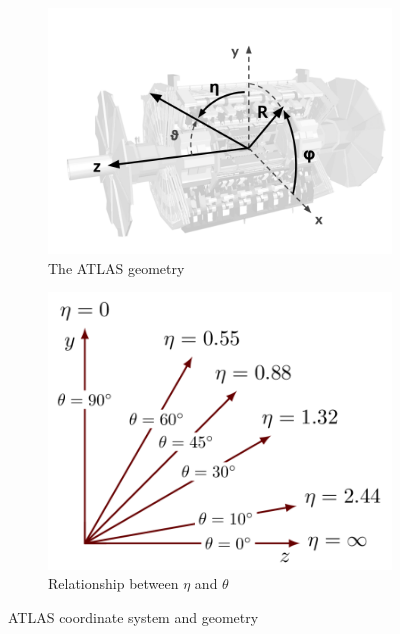 \begin{figure}
     \centering
     \begin{subfigure}[b]{0.45\textwidth}
         \centering
         \includegraphics[width=\textwidth]{figures/ch4/ATLASgeometry.png}
         \caption{The ATLAS geometry}
         \label{fig:ATLASgeometry}
     \end{subfigure}
     \hfill
     \begin{subfigure}[b]{0.45\textwidth}
         \centering
         \includegraphics[width=\textwidth]{figures/ch4/etaTheta.png}
         \caption{Relationship between $\eta$ and $\theta$}
         \label{fig:etaTheta}
     \end{subfigure}
     \hfill
     \caption {ATLAS coordinate system and geometry}
\end{figure}

